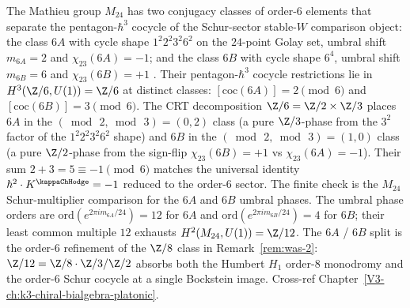 \begin{remark}
\label{rem:was-6A-6B}
The Mathieu group $M_{24}$ has two conjugacy classes of order-$6$
elements that separate the pentagon-$\hbar^3$ cocycle of the
Schur-sector stable-$W$ comparison object:
the class $6A$ with cycle shape $1^2 2^2 3^2 6^2$ on the $24$-point
Golay set, umbral shift $m_{6A} = 2$ and $\chi_{23}(6A) = -1$; and
the class $6B$ with cycle shape $6^4$, umbral shift $m_{6B} = 6$ and
$\chi_{23}(6B) = +1$ \cite{ChengDuncanHarvey2014,ConwayCurtisNortonParkerWilson1985}.
Their pentagon-$\hbar^3$ cocycle restrictions lie in
$H^3(\Z/6, U(1)) = \Z/6$ at distinct classes:
$[\mathrm{coc}(6A)] = 2 \pmod{6}$ and $[\mathrm{coc}(6B)] = 3 \pmod{6}$.
The CRT decomposition $\Z/6 = \Z/2 \times \Z/3$ places $6A$ in the
$(\bmod\,2,\bmod\,3) = (0,2)$ class (a pure $\Z/3$-phase from the
$3^2$ factor of the $1^2 2^2 3^2 6^2$ shape) and $6B$ in the
$(\bmod\,2,\bmod\,3) = (1,0)$ class (a pure $\Z/2$-phase from the
sign-flip $\chi_{23}(6B) = +1$ vs $\chi_{23}(6A) = -1$). Their sum
$2 + 3 = 5 \equiv -1 \pmod 6$ matches the universal identity
$\hbar^2 \cdot K^{\kappaChHodge} = -1$ reduced to the order-$6$
sector. The finite check is the $M_{24}$ Schur-multiplier comparison
for the $6A$ and $6B$ umbral phases.
The umbral phase orders are $\mathrm{ord}(e^{2\pi i m_{6A}/24}) = 12$
for $6A$ and $\mathrm{ord}(e^{2\pi i m_{6B}/24}) = 4$ for $6B$; their
least common multiple $12$ exhausts $H^2(M_{24}, U(1)) = \Z/12$.
The $6A$ / $6B$ split is the order-$6$ refinement of the $\Z/8$ class
in Remark~\ref{rem:was-2}: $\Z/12 = \Z/8 \cdot \Z/3 / \Z/2$
absorbs both the Humbert $H_1$ order-$8$ monodromy and the order-$6$
Schur cocycle at a single Bockstein image. Cross-ref
Chapter~\ref{V3-ch:k3-chiral-bialgebra-platonic}.
\end{remark}
